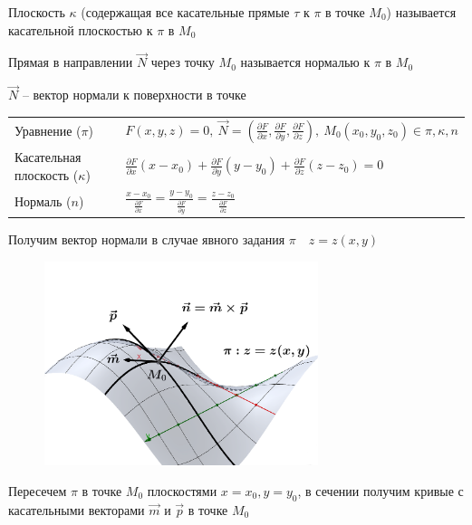 \documentclass[12pt]{article}
\begin{document}
    \hypertarget{tangentplanetosurface}{}

    \Def Плоскость $\kappa$ (содержащая все касательные прямые $\tau$ к $\pi$ в точке $M_0$) называется касательной плоскостью к $\pi$ в $M_0$

    \Defs Прямая в направлении $\vec{N}$ через точку $M_0$ называется нормалью к $\pi$ в $M_0$

    $\vec{N}$ -- вектор нормали к поверхности в точке

    \begin{tabular}{ll}
        Уравнение ($\pi$) & $F(x, y, z) = 0, \ \vec{N} = \left(\frac{\partial F}{\partial x}, \frac{\partial F}{\partial y}, \frac{\partial F}{\partial z}\right), \ M_0(x_0, y_0, z_0) \in \pi, \kappa, n$ \\

        Касательная плоскость ($\kappa$) & $\frac{\partial F}{\partial x} (x - x_0) + \frac{\partial F}{\partial y} (y - y_0) + \frac{\partial F}{\partial z} (z - z_0) = 0$ \\

        Нормаль ($n$) & $\frac{x - x_0}{\frac{\partial F}{\partial x}} = \frac{y - y_0}{\frac{\partial F}{\partial y}} = \frac{z - z_0}{\frac{\partial F}{\partial z}}$
    \end{tabular}

    \Nota Получим вектор нормали в случае явного задания $\pi \quad z = z(x, y)$


    \begin{figure}
        \includegraphics[width=8cm]{calculus/images/calculus_2024_03_20_1}
    \end{figure}

    Пересечем $\pi$ в точке $M_0$ плоскостями $x = x_0, y = y_0$, в сечении получим кривые с касательными векторами $\vec m$ и $\vec p$ в точке $M_0$
\end{document}
